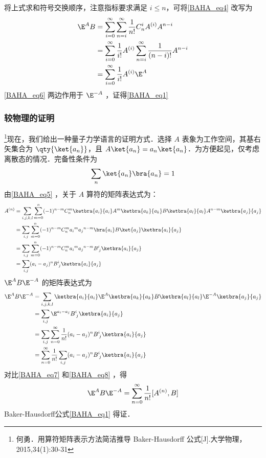 将上式求和符号交换顺序，注意指标要求满足 $i\leq n$，可将\autoref{BAHA_eq4} 改写为
\begin{equation}\label{BAHA_eq6}
\begin{aligned}
\E^A B&=\sum_{i=0}^{\infty}\sum_{n=i}^{\infty}\frac{1}{n!}C_{n}^iA^{(i)}A^{n-i}\\
&=\sum_{i=0}^{\infty}\frac{1}{i!}A^{(i)}\sum_{n=i}^{\infty}\frac{1}{(n-i)!}A^{n-i}\\
&=\sum_{i=0}^{\infty}\frac{1}{i!}A^{(i)}\E^A
\end{aligned}
\end{equation}
\autoref{BAHA_eq6} 两边作用于 $\E^{-A}$ ，证得\autoref{BAHA_eq1} 

\subsubsection{较物理的证明}
\footnote{何勇．用算符矩阵表示方法简洁推导 Baker-Hausdorff 公式[J].大学物理，2015,34(1):30-31}现在，我们给出一种量子力学语言的证明方式．选择 $A$ 表象为工作空间，其基右矢集合为 $\qty{\ket{a_n}}$，且 $A\ket{a_n}=a_n\ket{a_n}$．为方便起见，仅考虑离散态的情况．完备性条件为
\begin{equation}
\sum_{n}\ket{a_n}\bra{a_n}=1
\end{equation}
由\autoref{BAHA_eq5} ，关于 $A$ 算符的矩阵表达式为：
\begin{equation}\label{BAHA_eq7}
\begin{aligned}
A^{(n)}&=\sum_{i,j,k,l}\sum_{m=0}^{n}(-1)^{n-m}C_{n}^{m}\ketbra{a_i}{a_i}A^m\ketbra{a_k}{a_k}B\ketbra{a_l}{a_l}A^{n-m}\ketbra{a_j}{a_j}\\
&=\sum_{i,j}\sum_{m=0}^{n}(-1)^{n-m}C_n^m{a_i}^m{a_j}^{n-m}\bra{a_i}B\ket{a_j}\ketbra{a_i}{a_j}\\
&=\sum_{i,j}\sum_{m=0}^{n}(-1)^{n-m}C_n^m{a_i}^m{a_j}^{n-m}B^i_{\; j}\ketbra{a_i}{a_j}\\
&=\sum_{i,j}(a_i-a_j)^nB^i_{\; j}\ketbra{a_i}{a_j}
\end{aligned}
\end{equation}
$\E^{A}B\E^{-A}$ 的矩阵表达式为
\begin{equation}\label{BAHA_eq8}
\begin{aligned}
\E^{A}B\E^{-A}&=\sum_{i,j,k,l}\ketbra{a_i}{a_i}\E^{A}\ketbra{a_k}{a_k}B\ketbra{a_l}{a_l}\E^{-A}\ketbra{a_j}{a_j}\\
&=\sum_{i,j}\E^{a_i-a_j}B^{i}_{\;j}\ketbra{a_i}{a_j}\\
&=\sum_{i,j}\sum_{n=0}^{\infty}\frac{1}{n!}(a_i-a_j)^nB^{i}_{\;j}\ketbra{a_i}{a_j}\\
&=\sum_{n=0}^{\infty}\frac{1}{n!}\sum_{i,j}(a_i-a_j)^nB^{i}_{\;j}\ketbra{a_i}{a_j}
\end{aligned}
\end{equation}
对比\autoref{BAHA_eq7} 和\autoref{BAHA_eq8} ，得
\begin{equation}\label{BAHA_eq1}
\E ^{A}B\E^{-A}=\sum_{n=0}^{\infty}\frac{1}{n!}[A^{(n)},B]
\end{equation}
Baker-Hausdorff公式\autoref{BAHA_eq1} 得证．

